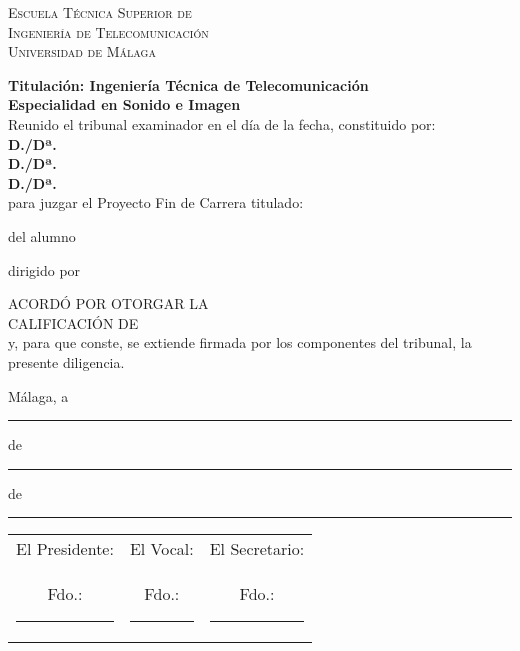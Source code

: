 \thispagestyle{empty}
\begin{center}
	\Large \sffamily \scshape %
	Escuela Técnica Superior de\\
	Ingeniería de Telecomunicación\\
	Universidad de Málaga
\end{center}

	{\bfseries \noindent Titulación: Ingeniería Técnica de Telecomunicación \\
	 Especialidad en Sonido e Imagen}\\[3ex]

	\noindent Reunido el tribunal examinador en el día de la fecha, constituido por:\\[3ex]
	\textbf{D./Dª.~}\hrulefill\\[3ex]
	\textbf{D./Dª.~}\hrulefill\\[3ex]
	\textbf{D./Dª.~}\hrulefill\\[3ex]
	
	para juzgar el Proyecto Fin de Carrera titulado:\noindent 
	
\begin{center}
	\large \bfseries \pfctitlename
\end{center}

\noindent del alumno 

\noindent dirigido por 

\bigskip

	\noindent ACORDÓ POR \hrulefill OTORGAR LA\\[3ex]%
	CALIFICACIÓN DE\hrulefill\\[3ex]
	
	
	\noindent y, para que conste, se extiende firmada por los componentes del tribunal, la presente diligencia.
	
	\bigskip

\hfill Málaga, a \rule{1cm}{0.1mm} de \rule{1cm}{0.1mm} de \rule{0.7cm}{0.1mm}

\vfill

\begin{center}
	\begin{tabular}{ccc}
	El Presidente: & El Vocal: & El Secretario:\\[2cm]
	Fdo.:\rule{3cm}{0.1mm} & Fdo.:\rule{3cm}{0.1mm} & Fdo.:\rule{3cm}{0.1mm}	
	\end{tabular}
\end{center}

\blankpage